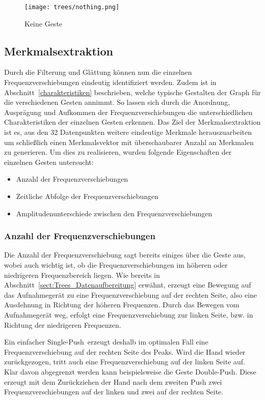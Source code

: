 \begin{figure}[htbp] \centering
\texttt{[image: trees/nothing.png]}
\caption{Keine Geste}
\label{fig:nothing}
\end{figure}

\subsection{Merkmalsextraktion}
Durch die Filterung und Glättung können nun die einzelnen Frequenzverschiebungen eindeutig identifiziert werden. Zudem ist in Abschnitt~\ref{charakteristiken} beschrieben, welche typische Gestalten der Graph für die verschiedenen Gesten annimmt. So lassen sich durch die Anordnung, Ausprägung und Aufkommen der Frequenzverschiebungen die unterschiedlichen Charakteristiken der einzelnen Gesten erkennen. Das Ziel der Merkmalsextraktion ist es, aus den 32 Datenpunkten weitere eindeutige Merkmale herauszuarbeiten um schließlich einen Merkmalsvektor mit überschaubarer Anzahl an Merkmalen zu generieren. Um dies zu realisieren, wurden folgende Eigenschaften der einzelnen Gesten untersucht:

\begin{itemize} 
\item Anzahl der Frequenzverschiebungen
\item Zeitliche Abfolge der Frequenzverschiebungen
\item Amplitudenunterschiede zwischen den Frequenzverschiebungen
\end{itemize}

\subsubsection*{Anzahl der Frequenzverschiebungen}
Die Anzahl der Frequenzverschiebung sagt bereits einiges über die Geste aus, wobei auch wichtig ist, ob die Frequenzverschiebungen im höheren oder niedrigeren Frequenzbereich liegen. Wie bereits in Abschnitt~\ref{sect:Trees_Datenaufbereitung} erwähnt, erzeugt eine Bewegung auf das Aufnahmegerät zu eine Frequenzverschiebung auf der rechten Seite, also eine Ausdehnung in Richtung der höheren Frequenzen. Durch das Bewegen vom Aufnahmegerät weg, erfolgt eine Frequenzverschiebung zur linken Seite, bzw. in Richtung der niedrigeren Frequenzen. 

Ein einfacher \glqq Single-Push\grqq\ erzeugt deshalb im optimalen Fall eine Frequenzverschiebung auf der rechten Seite des Peaks. Wird die Hand wieder zurückgezogen, tritt auch eine Frequenzverschiebung auf der linken Seite auf. Klar davon abgegrenzt werden kann beispielsweise die Geste \glqq Double-Push\grqq. Diese erzeugt mit dem Zurückziehen der Hand nach dem zweiten Push zwei Frequenzverschiebungen auf der linken und zwei auf der rechten Seite.

